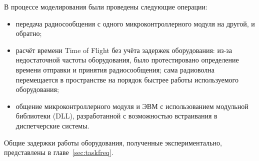 В процессе моделирования были проведены следующие операции:

\begin{itemize}
    \item передача радиосообщения с одного микроконтроллерного модуля на другой, и обратно;
    \item расчёт времени Time of Flight без учёта задержек оборудования: из-за недостаточной частоты оборудования, было протестировано определение времени отправки и принятия радиосообщения; сама радиоволна перемещается в пространстве на порядок быстрее работы используемого оборудования;
    \item общение микроконтроллерного модуля и ЭВМ с использованием модульной библиотеки (DLL), разработанной с возможностью встраивания в диспетчерские системы.
\end{itemize}

Общие задержки работы оборудования, полученные экспериментально, представлены в главе~\ref{sec:taskfreq}.
